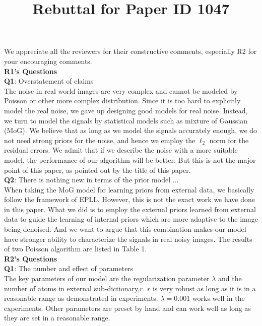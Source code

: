 \documentclass[10pt,twocolumn,letterpaper]{article}
\begin{document}
\title{Rebuttal for Paper ID 1047}  %

\maketitle
\thispagestyle{empty}



We appreciate all the reviewers for their constructive comments, especially R2 for your encouraging comments.
\\
\textbf{R1's Questions}
\\
\textbf{Q1}: Overstatement of claims
\\
The noise in real world images are very complex and cannot be modeled by Poisson or other more complex distribution. Since it is too hard to explicitly model the real noise, we gave up designing good models for real noise. Instead, we turn to model the signals by statistical models such as mixture of Gaussian (MoG). We believe that as long as we model the signals accurately enough, we do not need strong priors for the noise, and hence we employ the $\ell_{2}$ norm for the residual errors. We admit that if we describe the noise with a more suitable model, the performance of our algorithm will be better. But this is not the major point of this paper, as pointed out by the title of this paper.
\\
\textbf{Q2}: There is nothing new in terms of the prior model ...
\\
When taking the MoG model for learning priors from external data, we basically follow the framework of EPLL. However, this is not the exact work we have done in this paper. What we did is to employ the external priors learned from external data to guide the learning of internal priors which are more adaptive to the image being denoised. And we want to argue that this combination makes our model have stronger ability to characterize the signals in real noisy images. The results of two Poisson algorithm are listed in Table 1.
\\
\textbf{R2's Questions}
\\
\textbf{Q1}: The number and effect of parameters
\\
The key parameters of our model are the regularization parameter $\lambda$ and the number of atoms in external sub-dictionary,$r$. $r$ is very robust as long as it is in a reasonable range as demonstrated in experiments. $\lambda=0.001$ works well in the experiments. Other parameters are preset by hand and can work well as long as they are set in a reasonable range.
\end{document}
